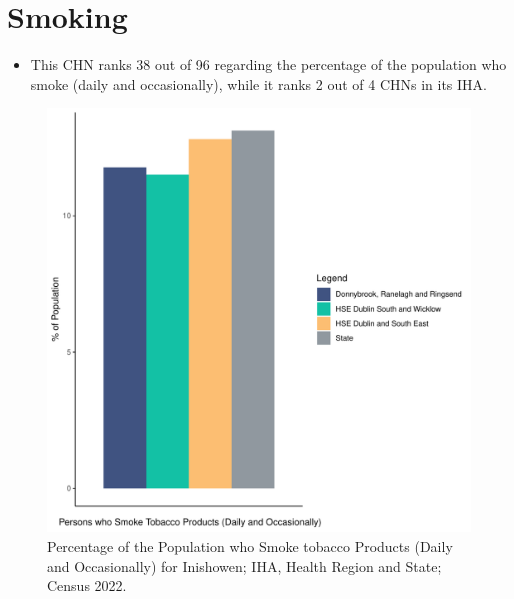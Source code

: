 \documentclass{article}
\begin{document}
\pagebreak

\section{Smoking}\label{sect:Smoking}
\begin{itemize}
\item This CHN ranks  38 out of 96 regarding the percentage of the population who smoke (daily and occasionally), while it ranks   2 out of 4 CHNs in its IHA.
\end{itemize}
\begin{figure}[H]
	\centering
	\includegraphics[width = 120mm]{../figures/SmokingED.pdf}
	\caption{Percentage of the Population who Smoke tobacco Products (Daily and Occasionally) for Inishowen; IHA, Health Region and State; Census 2022.}
	\label{fig:2ae19629-1a6a-13a3-e055-000000000001}
	\end{figure}
	
\end{document}
